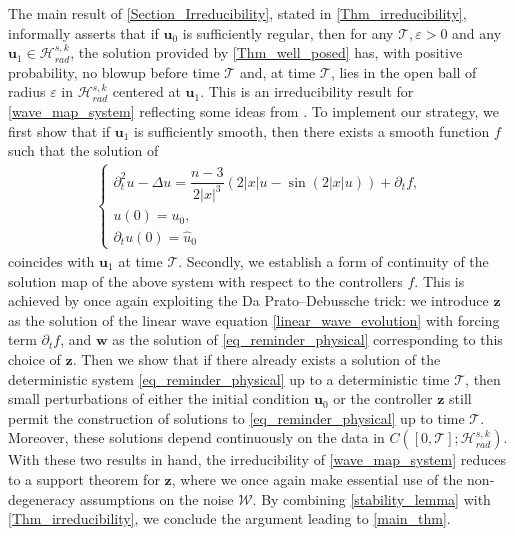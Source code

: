 \documentclass[12pt,reqno]{amsart}
\theoremstyle{plain}
\theoremstyle{remark}
\theoremstyle{plain}
\theoremstyle{definition}
\numberwithin{equation}{section}
\numberwithin{equation}{section}
\newcommand{\HH}{\mathcal{H}}
\begin{document}
	The main result of \autoref{Section_Irreducibility}, stated in \autoref{Thm_irreducibility}, informally asserts that if $\mathbf{u}_0$ is sufficiently regular, then for any $\mathcal{T}, \varepsilon > 0$ and any $\mathbf{u}_1 \in \HH_{rad}^{s,k}$, the solution provided by \autoref{Thm_well_posed} has, with positive probability, no blowup before time $\mathcal{T}$ and, at time $\mathcal{T}$, lies in the open ball of radius $\varepsilon$ in $\HH_{rad}^{s,k}$ centered at $\mathbf{u}_1$. This is an irreducibility result for \eqref{wave_map_system} reflecting some ideas from \cite{de2002effect, flandoli1997irreducibility}. To implement our strategy, we first show that if $\mathbf{u}_1$ is sufficiently smooth, then there exists a smooth function $f$ such that the solution of
	\begin{align*}
		\begin{cases}
			\partial_t^2 u-\Delta u=\dfrac{n-3}{2\lvert x\rvert^3}(2\lvert x\rvert u-\sin (2\lvert x\rvert u))+\partial_t f,\\
			u(0)= u_0,\\
			\partial_t u(0)=\hat{u}_0  
		\end{cases}
	\end{align*}
	coincides with $\mathbf{u}_1$ at time $\mathcal{T}$. Secondly, we establish a form of continuity of the solution map of the above system with respect to the controllers $f$. This is achieved by once again exploiting the Da Prato–Debussche trick: we introduce $\mathbf{z}$ as the solution of the linear wave equation \eqref{linear_wave_evolution} with forcing term $\partial_t f$, and $\mathbf{w}$ as the solution of \eqref{eq_reminder_physical} corresponding to this choice of $\mathbf{z}$. Then we show that if there already exists a solution of the deterministic system \eqref{eq_reminder_physical} up to a deterministic time $\mathcal{T}$, then small perturbations of either the initial condition $\mathbf{u}_0$ or the controller $\mathbf{z}$ still permit the construction of solutions to \eqref{eq_reminder_physical} up to time $\mathcal{T}$. Moreover, these solutions depend continuously on the data in $C([0,\mathcal{T}]; \HH_{rad}^{s,k})$. With these two results in hand, the irreducibility of \eqref{wave_map_system} reduces to a support theorem for $\mathbf{z}$, where we once again make essential use of the non-degeneracy assumptions on the noise $\mathcal{W}$.
	By combining \autoref{stability_lemma} with \autoref{Thm_irreducibility}, we conclude the argument leading to \autoref{main_thm}.
	
\end{document}
